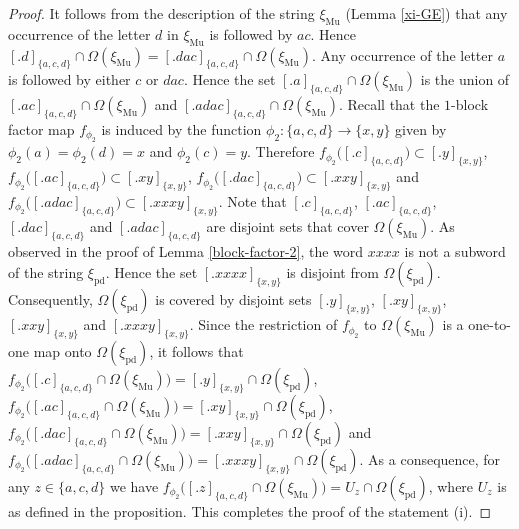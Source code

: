 \documentclass[12pt]{article}
\theoremstyle{definition}
\def\Om{\Omega}
\def\xipd{\xi_{\mathrm{pd}}}
\def\xiGE{\xi_{\mathrm{Mu}}}
\begin{document}
\begin{proof}
It follows from the description of the string $\xiGE$ (Lemma \ref{xi-GE}) 
that any occurrence of the letter $d$ in $\xiGE$ is followed by $ac$.  
Hence $[.d]_{\{a,c,d\}}\cap\Om(\xiGE)=[.dac]_{\{a,c,d\}}\cap\Om(\xiGE)$.  
Any occurrence of the letter $a$ is followed by either $c$ or $dac$.  Hence 
the set $[.a]_{\{a,c,d\}}\cap\Om(\xiGE)$ is the union of 
$[.ac]_{\{a,c,d\}}\cap\Om(\xiGE)$ and $[.adac]_{\{a,c,d\}}\cap\Om(\xiGE)$.  
Recall that the $1$-block factor map $f_{\phi_2}$ is induced by the 
function $\phi_2:\{a,c,d\}\to\{x,y\}$ given by $\phi_2(a)=\phi_2(d)=x$ and 
$\phi_2(c)=y$.  Therefore $f_{\phi_2}\bigl([.c]_{\{a,c,d\}}\bigr)\subset 
[.y]_{\{x,y\}}$, $f_{\phi_2}\bigl([.ac]_{\{a,c,d\}}\bigr)\subset 
[.xy]_{\{x,y\}}$, $f_{\phi_2}\bigl([.dac]_{\{a,c,d\}}\bigr)\subset 
[.xxy]_{\{x,y\}}$ and $f_{\phi_2}\bigl([.adac]_{\{a,c,d\}}\bigr)\subset 
[.xxxy]_{\{x,y\}}$.  Note that $[.c]_{\{a,c,d\}}$, $[.ac]_{\{a,c,d\}}$, 
$[.dac]_{\{a,c,d\}}$ and $[.adac]_{\{a,c,d\}}$ are disjoint sets that cover 
$\Om(\xiGE)$.  As observed in the proof of Lemma \ref{block-factor-2}, the 
word $xxxx$ is not a subword of the string $\xipd$.  Hence the set 
$[.xxxx]_{\{x,y\}}$ is disjoint from $\Om(\xipd)$.  Consequently, 
$\Om(\xipd)$ is covered by disjoint sets $[.y]_{\{x,y\}}$, 
$[.xy]_{\{x,y\}}$, $[.xxy]_{\{x,y\}}$ and $[.xxxy]_{\{x,y\}}$.  Since the 
restriction of $f_{\phi_2}$ to $\Om(\xiGE)$ is a one-to-one map onto 
$\Om(\xipd)$, it follows that 
$f_{\phi_2}\bigl([.c]_{\{a,c,d\}}\cap\Om(\xiGE)\bigr)=
[.y]_{\{x,y\}}\cap\Om(\xipd)$, 
$f_{\phi_2}\bigl([.ac]_{\{a,c,d\}}\cap\Om(\xiGE)\bigr)= 
[.xy]_{\{x,y\}}\cap\Om(\xipd)$, 
$f_{\phi_2}\bigl([.dac]_{\{a,c,d\}}\cap\Om(\xiGE)\bigr)=
[.xxy]_{\{x,y\}}\cap\Om(\xipd)$ and 
$f_{\phi_2}\bigl([.adac]_{\{a,c,d\}}\cap\Om(\xiGE)\bigr)=
[.xxxy]_{\{x,y\}}\cap\Om(\xipd)$.  As a consequence, for any 
$z\in\{a,c,d\}$ we have 
$f_{\phi_2}\bigl([.z]_{\{a,c,d\}}\cap\Om(\xiGE)\bigr)=U_z\cap\Om(\xipd)$, 
where $U_z$ is as defined in the proposition.  This completes the proof of 
the statement (i).


\end{proof}
\end{document}
